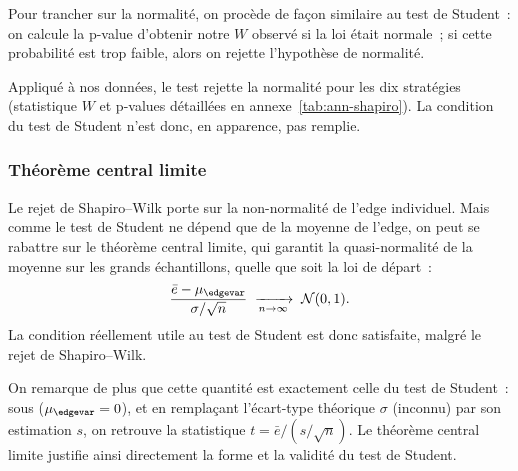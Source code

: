 Pour trancher sur la normalité, on procède de façon similaire au test de
Student~: on calcule la p-value d'obtenir notre \(W\) observé si la loi
était normale~; si cette probabilité est trop faible, alors on rejette
l'hypothèse de normalité.

Appliqué à nos données, le test rejette la normalité pour les dix
stratégies (statistique \(W\) et p-values détaillées en
annexe~\ref{tab:ann-shapiro}). La condition du test de Student n'est donc,
en apparence, pas remplie.

\subsubsection*{Théorème central limite} %
Le rejet de Shapiro--Wilk porte sur la non-normalité de l'edge
individuel. Mais comme le test de Student ne dépend que de la
moyenne de l'edge, on peut se rabattre sur le théorème central
limite, qui garantit la quasi-normalité de la moyenne sur les grands
échantillons, quelle que soit la loi de départ~:
\[
  \frac{\bar e - \mu_{\edgevar}}{\sigma/\sqrt{n}}
  \;\xrightarrow[n \to \infty]{}\; \mathcal{N}(0,1) .
\]
La condition réellement utile au test de Student est donc satisfaite,
malgré le rejet de Shapiro--Wilk.

On remarque de plus que cette quantité est exactement celle du test de
Student~: sous \Hzero{} (\(\mu_{\edgevar} = 0\)), et en remplaçant l'écart-type
théorique \(\sigma\) (inconnu) par son estimation \(s\), on retrouve la
statistique \(t = \bar e / (s/\sqrt{n})\). Le théorème central limite
justifie ainsi directement la forme et la validité du test de Student.

